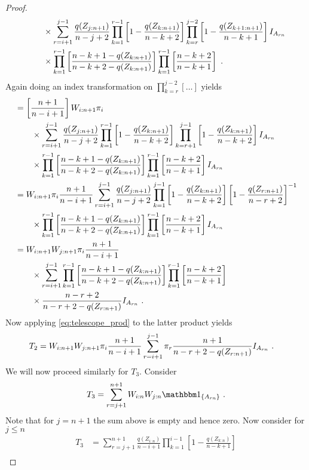 \begin{proof}
\begin{align*}
	& \qquad \times \sum\limits_{r=i+1}^{j-1} \frac{q(Z_{j:n+1})}{n-j+2} \prod_{k=1}^{r-1}\left[1-\frac{q(Z_{k:n+1})}{n-k+2}\right]\prod_{k=r}^{j-2}\left[1-\frac{q(Z_{k+1:n+1})}{n-k+1}\right]I_{A_{rn}}\\
	& \qquad \times \prod_{k=1}^{r-1}\left[\frac{n-k+1-q(Z_{k:n+1})}{n-k+2-q(Z_{k:n+1})}\right] \prod_{k=1}^{r-1}\left[\frac{n-k+2}{n-k+1}\right]\textrm{ .}
\end{align*}
%
Again doing an index transformation on $\prod_{k=r}^{j-2}[\ldots]$ yields
\begin{align*}
	&= \left[\frac{n+1}{n-i+1}\right]W_{i:n+1}\pi_i\\
	& \qquad \times \sum\limits_{r=i+1}^{j-1} \frac{q(Z_{j:n+1})}{n-j+2} \prod_{k=1}^{r-1}\left[1-\frac{q(Z_{k:n+1})}{n-k+2}\right]\prod_{k=r+1}^{j-1}\left[1-\frac{q(Z_{k:n+1})}{n-k+2}\right]I_{A_{rn}}\\
	& \qquad \times \prod_{k=1}^{r-1}\left[\frac{n-k+1-q(Z_{k:n+1})}{n-k+2-q(Z_{k:n+1})}\right] \prod_{k=1}^{r-1}\left[\frac{n-k+2}{n-k+1}\right]I_{A_{rn}}\\	
	&= W_{i:n+1} \pi_i \frac{n+1}{n-i+1} \sum\limits_{r=i+1}^{j-1}\frac{q(Z_{j:n+1})}{n-j+2} \prod_{k=1}^{j-1}\left[1-\frac{q(Z_{k:n+1})}{n-k+2}\right] \left[ 1 - \frac{q(Z_{r:n+1})}{n-r+2}\right]^{-1}\\
	& \qquad \times \prod_{k=1}^{r-1} \left[\frac{n-k+1-q(Z_{k:n+1})}{n-k+2-q(Z_{k:n+1})}\right] \prod_{k=1}^{r-1}\left[\frac{n-k+2}{n-k+1}\right]I_{A_{rn}}\\
	&= W_{i:n+1}W_{j:n+1} \pi_i \frac{n+1}{n-i+1} \\
	& \qquad \times \sum\limits_{r=i+1}^{j-1} \prod_{k=1}^{r-1} \left[\frac{n-k+1-q(Z_{k:n+1})}{n-k+2-q(Z_{k:n+1})}\right] \prod_{k=1}^{r-1}\left[\frac{n-k+2}{n-k+1}\right]\\
	& \qquad \times \frac{n-r+2}{n-r+2-q(Z_{r:n+1})} I_{A_{rn}}\textrm{ .}
\end{align*}
%
Now applying \eqref{eq:telescope_prod} to the latter product yields
\begin{align*}
	T_2	&= W_{i:n+1}W_{j:n+1} \pi_i \frac{n+1}{n-i+1} \sum\limits_{r=i+1}^{j-1} \pi_r \frac{n+1}{n-r+2-q(Z_{r:n+1})} I_{A_{rn}}	\textrm{ .}
\end{align*}
%
We will now proceed similarly for $T_3$. Consider
$$T_3 = \sum\limits_{r=j+1}^{n+1} \wn{i}{n}\wn{j}{n}\I{A_{rn}}\mdot$$
%
Note that for $j=n+1$ the sum above is empty and hence zero. Now consider for $j\leq n$
\begin{align*}
	T_3 &= \sum\limits_{r=j+1}^{n+1} \frac{q(Z_{i:n})}{n-i+1} \prod\limits_{k=1}^{i-1} \left[1-\frac{q(Z_{k:n})}{n-k+1}\right]\\

\end{align*}
\end{proof}
